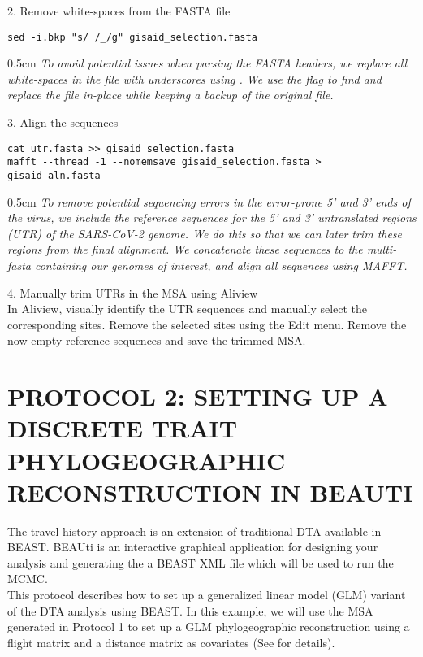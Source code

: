 \documentclass{article}
\newcommand{\ann}[1]{
\begin{adjustwidth}{0.5cm}{}
\it{#1}\\
\end{adjustwidth}}
\newcommand{\code}[1]{
{\upshape\ttfamily{#1}}}
\begin{document}
2. Remove white-spaces from the FASTA file %
\begin{verbatim}
sed -i.bkp "s/ /_/g" gisaid_selection.fasta 
\end{verbatim}

\ann{To avoid potential issues when parsing the FASTA headers, we replace all white-spaces in the file with underscores using \code{sed}.  We use the \code{-i} flag to find and replace the file in-place while keeping a backup of the original file.}

3. Align the sequences
\begin{verbatim}
cat utr.fasta >> gisaid_selection.fasta
mafft --thread -1 --nomemsave gisaid_selection.fasta > gisaid_aln.fasta
\end{verbatim}

\ann{To remove potential sequencing errors in the error-prone 5' and 3' ends of the virus, we include the reference sequences for the 5' and 3' untranslated regions (UTR) of the SARS-CoV-2 genome. We do this so that we can later trim these regions from the final alignment. We concatenate these sequences to the multi-fasta containing our genomes of interest, and align all sequences using MAFFT.}

4. Manually trim UTRs in the MSA using Aliview\\

In Aliview, visually identify the UTR sequences and manually select the corresponding sites. Remove the selected sites using the Edit menu. Remove the now-empty reference sequences and save the trimmed MSA.\\

\section*{PROTOCOL 2: SETTING UP A DISCRETE TRAIT PHYLOGEOGRAPHIC RECONSTRUCTION IN BEAUTI}

The travel history approach is an extension of traditional DTA available in BEAST. BEAUti is an interactive graphical application for designing your analysis and generating the a BEAST XML file which will be used to run the MCMC. \\ 

This protocol describes how to set up a generalized linear model (GLM) variant of the DTA analysis using BEAST. In this example, we will use the MSA generated in Protocol 1 to set up a GLM phylogeographic reconstruction using a flight matrix and a distance matrix as covariates (See \cite{travhist} for details).
\end{document}
